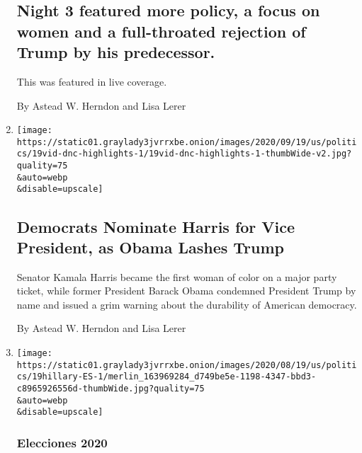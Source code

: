 \begin{enumerate}
  \hypertarget{night-3-featured-more-policy-a-focus-on-women-and-a-full-throated-rejection-of-trump-by-his-predecessor}{%
  \subsection{Night 3 featured more policy, a focus on women and a
  full-throated rejection of Trump by his
  predecessor.}\label{night-3-featured-more-policy-a-focus-on-women-and-a-full-throated-rejection-of-trump-by-his-predecessor}}

  This was featured in live coverage.

  By Astead W. Herndon and Lisa Lerer
\item
  \href{/2020/08/19/us/politics/democratic-national-convention-recap.html}{}

  \texttt{[image: https://static01.graylady3jvrrxbe.onion/images/2020/09/19/us/politics/19vid-dnc-highlights-1/19vid-dnc-highlights-1-thumbWide-v2.jpg?quality=75\\\&auto=webp\\\&disable=upscale]}

  \hypertarget{democrats-nominate-harris-for-vice-president-as-obama-lashes-trump}{%
  \subsection{Democrats Nominate Harris for Vice President, as Obama
  Lashes
  Trump}\label{democrats-nominate-harris-for-vice-president-as-obama-lashes-trump}}

  Senator Kamala Harris became the first woman of color on a major party
  ticket, while former President Barack Obama condemned President Trump
  by name and issued a grim warning about the durability of American
  democracy.

  By Astead W. Herndon and Lisa Lerer
\item
  \href{/es/2020/08/19/espanol/estados-unidos/hillary-clinton-convencion.html}{}

  \texttt{[image: https://static01.graylady3jvrrxbe.onion/images/2020/08/19/us/politics/19hillary-ES-1/merlin\_163969284\_d749be5e-1198-4347-bbd3-c8965926556d-thumbWide.jpg?quality=75\\\&auto=webp\\\&disable=upscale]}

  \hypertarget{elecciones-2020}{%
  \subsubsection{Elecciones 2020}\label{elecciones-2020}}

  \hypertarget{hillary-clinton-en-la-convenciuxf3n-demuxf3crata-un-retorno-agridulce}{%
}
\end{enumerate}
